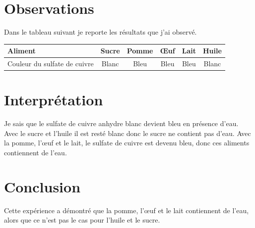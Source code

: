 \documentclass[12pt,a4paper]{article}
\begin{document}
\section{Observations}

Dans le tableau suivant je reporte les résultats que j'ai observé.

\begin{tabular}{|@{\ }l@{\ }|@{\ }c@{\ }|@{\ }c@{\ }|@{\ }c@{\ }|@{\ }c@{\ }|@{\ }c@{\ }|}
	\hline
	Aliment                      & Sucre & Pomme & \OE uf & Lait & Huile \\ \hline
	Couleur du sulfate de cuivre & Blanc & Bleu  & Bleu   & Bleu & Blanc \\ \hline
\end{tabular}

\newpage

\section{Interprétation}

Je sais que le sulfate de cuivre anhydre blanc devient bleu en présence d'eau. Avec le sucre et l'huile il est resté blanc donc le sucre ne contient pas d'eau. Avec la pomme, l'\oe uf et le lait, le sulfate de cuivre est devenu bleu, donc ces aliments contiennent de l'eau.

\section{Conclusion}

Cette expérience a démontré que la pomme, l'\oe uf et le lait contiennent de l'eau, alors que ce n'est pas le cas pour l'huile et le sucre.
\end{document}
